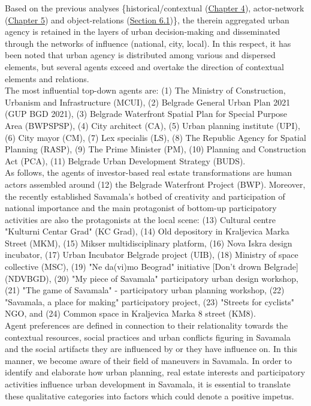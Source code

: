 \documentclass[11pt]{report}
\begin{document}
Based on the previous analyses \{historical/contextual (\href{Chapter 4}{Chapter 4}), actor-network (\href{Chapter 5}{Chapter 5}) and object-relations (\href{Section 6.1}{Section 6.1})\}, the therein aggregated urban agency is retained in the layers of urban decision-making and disseminated through the networks of influence (national, city, local).
In this respect, it has been noted that urban agency is distributed among various and dispersed elements, but several agents exceed and overtake the direction of contextual elements and relations.
\\

The most influential top-down agents are: 
(1) The Ministry of Construction, Urbanism and Infrastructure (MCUI),
(2) Belgrade General Urban Plan 2021 (GUP BGD 2021),
(3) Belgrade Waterfront Spatial Plan for Special Purpose Area (BWPSPSP), 
(4) City architect (CA),
(5) Urban planning institute (UPI),
(6) City mayor (CM),
(7) Lex specialis (LS),
(8) The Republic Agency for Spatial Planning (RASP),
(9) The Prime Minister (PM),
(10) Planning and Construction Act (PCA),
(11) Belgrade Urban Development Strategy (BUDS).
\\

As follows, the agents of investor-based real estate transformations are human actors assembled around
(12) the Belgrade Waterfront Project (BWP). Moreover, the recently established Savamala's hotbed of creativity and participation of national importance and the main protagonist of bottom-up participatory activities are also the protagonists at the local scene: 
(13) Cultural centre "Kulturni Centar Grad" (KC Grad),
(14) Old depository in Kraljevica Marka Street (MKM),
(15) Mikser multidisciplinary platform,
(16) Nova Iskra design incubator,
(17) Urban Incubator Belgrade project (UIB),
(18) Ministry of space collective (MSC),
(19) "Ne da(vi)mo Beograd" initiative [Don't drown Belgrade] (NDVBGD),
(20) "My piece of Savamala" participatory urban design workshop,
(21) "The game of Savamala" - participatory urban planning workshop,
(22) "Savamala, a place for making" participatory project,
(23) "Streets for cyclists" NGO,
and
(24) Common space in Kraljevica Marka 8 street (KM8).
\\

Agent preferences are defined in connection to their relationality towards the contextual resources, social practices and urban conflicts figuring in Savamala and the social artifacts they are influenced by or they have influence on.
In this manner, we become aware of their field of maneuvers in Savamala.
In order to identify and elaborate how urban planning, real estate interests and participatory activities influence urban development in Savamala, it is essential to translate these qualitative categories into factors which could denote a positive impetus.
\\
\end{document}
